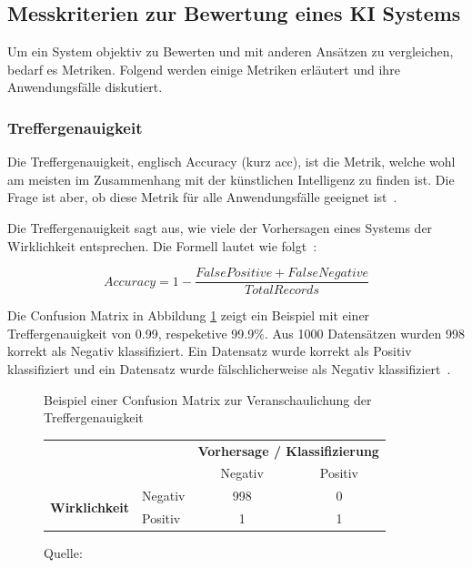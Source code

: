 \subsection{Messkriterien zur Bewertung eines KI Systems}
\label{chap:metrices}

Um ein System objektiv zu Bewerten und mit anderen Ansätzen zu vergleichen, bedarf es Metriken. Folgend werden einige Metriken erläutert und ihre Anwendungsfälle diskutiert.

\subsubsection{Treffergenauigkeit}

Die Treffergenauigkeit, englisch Accuracy (kurz acc), ist die Metrik, welche wohl am meisten im Zusammenhang mit der künstlichen Intelligenz zu finden ist. Die Frage ist aber, ob diese Metrik für alle Anwendungsfälle geeignet ist~\autocite{TDSAccuracy}.

Die Treffergenauigkeit sagt aus, wie viele der Vorhersagen eines Systems der Wirklichkeit entsprechen. Die Formell lautet wie folgt~\autocite{TDSAccuracy}: 

$$Accuracy = 1 - \frac{False Positive + False Negative}{Total Records}$$

Die Confusion Matrix in Abbildung \ref{cm-sample} zeigt ein Beispiel mit einer Treffergenauigkeit von 0.99, respeketive 99.9\%. Aus 1000 Datensätzen wurden 998 korrekt als Negativ klassifiziert. Ein Datensatz wurde korrekt als Positiv klassifiziert und ein Datensatz wurde fälschlicherweise als Negativ klassifiziert~\autocite{TDSAccuracy}.

\begin{figure}[h!]
    \centering
    \captionsetup{width=.9\linewidth}
    \caption{Beispiel einer Confusion Matrix zur Veranschaulichung der Treffergenauigkeit}
    \def\arraystretch{1.5}
    \begin{tabular}{llcc}
        \multicolumn{2}{l}{}                                                                       & \multicolumn{2}{c}{\textbf{Vorhersage / Klassifizierung}}   \\ \cline{3-4} 
        \multicolumn{1}{c}{\textbf{}}                               & \multicolumn{1}{l|}{}        & \multicolumn{1}{c|}{Negativ} & \multicolumn{1}{c|}{Positiv} \\ \cline{2-4} 
        \multicolumn{1}{l|}{\multirow{2}{*}{\textbf{Wirklichkeit}}} & \multicolumn{1}{l|}{Negativ} & \multicolumn{1}{c|}{998}    & \multicolumn{1}{c|}{0}       \\ \cline{2-4} 
        \multicolumn{1}{l|}{}                                       & \multicolumn{1}{l|}{Positiv} & \multicolumn{1}{c|}{1}       & \multicolumn{1}{c|}{1}       \\ \cline{2-4} 
    \end{tabular}
    \caption*{Quelle: \textcite{TDSAccuracy}}
    \label{cm-sample}
\end{figure}


